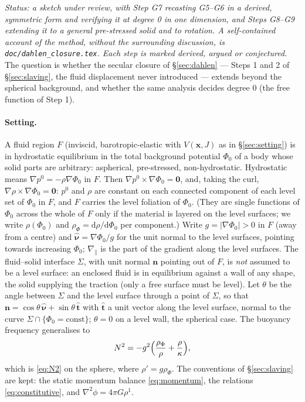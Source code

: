 \documentclass[11pt]{article}
\newcommand{\bn}{\mathbf{n}}
\newcommand{\code}[1]{\texttt{#1}}
\newcommand{\nuh}{\hat{\boldsymbol{\nu}}}
\begin{document}
\emph{Status: a sketch under review, with Step G7 recasting G5--G6 in
a derived, symmetric form and verifying it at degree 0 in one
dimension, and Steps G8--G9 extending it to a general pre-stressed
solid and to rotation. A self-contained account of the method, without
the surrounding discussion, is \code{doc/dahlen\_closure.tex}. Each step
is marked \emph{derived}, \emph{argued} or \emph{conjectured}.}
The question is whether the secular closure of \S\ref{sec:dahlen} ---
Steps 1 and 2 of \S\ref{sec:slaving}, the fluid displacement never
introduced --- extends beyond the spherical background, and whether the
same analysis decides degree 0 (the free function of Step 1).

\paragraph{Setting.} A fluid region $F$ (inviscid, barotropic-elastic
with $V(\mathbf x, J)$ as in \S\ref{sec:setting}) is in hydrostatic
equilibrium in the total background potential $\Phi_0$ of a body whose
solid parts are arbitrary: aspherical, pre-stressed, non-hydrostatic.
Hydrostatic means $\nabla p^0 = -\rho\nabla\Phi_0$ in $F$. Then
$\nabla p^0 \times \nabla\Phi_0 = \mathbf 0$, and, taking the curl,
$\nabla\rho \times \nabla\Phi_0 = \mathbf 0$: $p^0$ and $\rho$ are
constant on each connected component of each level set of $\Phi_0$ in
$F$, and $F$ carries the level foliation of $\Phi_0$. (They are single
functions of $\Phi_0$ across the whole of $F$ only if the material is
layered on the level surfaces; we write $\rho(\Phi_0)$ and
$\rho_\Phi = \mathrm{d}\rho/\mathrm{d}\Phi_0$ per component.) Write
$g = |\nabla\Phi_0| > 0$ in $F$ (away from a centre) and
$\nuh = \nabla\Phi_0/g$ for the unit normal to the level surfaces,
pointing towards increasing $\Phi_0$; $\nabla_{\!\parallel}$ is the
part of the gradient along the level surfaces. The fluid--solid
interface $\Sigma$, with unit normal $\bn$ pointing out of $F$, is
\emph{not} assumed to be a level surface: an enclosed fluid is in
equilibrium against a wall of any shape, the solid supplying the
traction (only a free surface must be level). Let $\theta$ be the angle
between $\Sigma$ and the level surface through a point of $\Sigma$, so
that $\bn = \cos\theta\,\nuh + \sin\theta\,\hat{\mathbf t}$ with
$\hat{\mathbf t}$ a unit vector along the level surface, normal to the
curve $\Sigma \cap \{\Phi_0 = \mathrm{const}\}$; $\theta = 0$ on a
level wall, the spherical case. The buoyancy frequency generalises to
\begin{equation}
  N^2 = -g^2\Bigl(\frac{\rho_\Phi}{\rho} + \frac{\rho}{\kappa}\Bigr),
  \label{eq:N2-general}
\end{equation}
which is \eqref{eq:N2} on the sphere, where $\rho' = g\rho_\Phi$. The
conventions of \S\ref{sec:slaving} are kept: the static momentum
balance \eqref{eq:momentum}, the relations \eqref{eq:constitutive},
and $\nabla^2\phi = 4\pi G\rho^1$.
\end{document}
